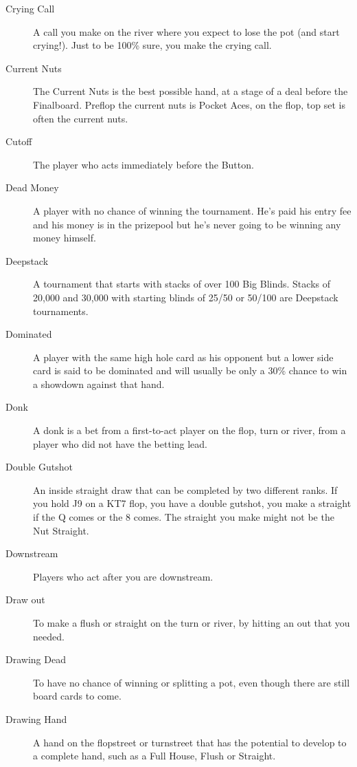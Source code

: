 \begin{description}
\item[Crying Call] A call you make on the river where you expect to
lose the pot (and start crying!). Just to be 100\% sure, you make the
crying call.

\item[Current Nuts] The Current Nuts is the best possible hand, at a
stage of a deal before the Finalboard. Preflop the current nuts is
Pocket Aces, on the flop, top set is often the current nuts.

\item[Cutoff] The player who acts immediately before the Button.

\item[Dead Money] A player with no chance of winning the tournament.
He's paid his entry fee and his money is in the prizepool but he's
never going to be winning any money himself.

\item[Deepstack] A tournament that starts with stacks of over 100 Big
Blinds. Stacks of 20,000 and 30,000 with starting blinds of 25/50 or
50/100 are Deepstack tournaments.

\item[Dominated] A player with the same high hole card as his opponent
but a lower side card is said to be dominated and will usually be
only a 30\% chance to win a showdown against that hand.

\item[Donk] A donk is a bet from a first-to-act player on the flop,
turn or river, from a player who did not have the betting lead.

\item[Double Gutshot] An inside straight draw that can be completed
by two different ranks. If you hold J9 on a KT7 flop, you have a double
gutshot, you make a straight if the Q comes or the 8 comes. The straight
you make might not be the Nut Straight.

\item[Downstream] Players who act after you are downstream.

\item[Draw out] To make a flush or straight on the turn or river, by
hitting an out that you needed.

\item[Drawing Dead] To have no chance of winning or splitting a pot,
even though there are still board cards to come.

\item[Drawing Hand] A hand on the flopstreet or turnstreet that has
the potential to develop to a complete hand, such as a Full House,
Flush or Straight.


\end{description}
